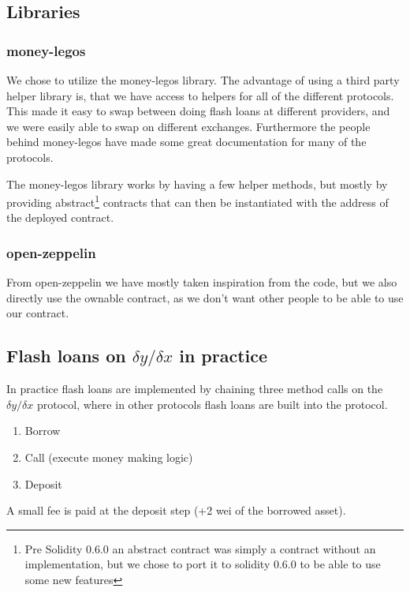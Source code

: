 \subsection{Libraries}
\subsubsection{money-legos}
We chose to utilize the money-legos library. The advantage of using a
third party helper library is, that we have access to helpers for all of the
different protocols. This made it easy to swap between doing flash loans at
different providers, and we were easily able to swap on different exchanges.
Furthermore the people behind money-legos have made some great
documentation for many of the protocols.

The money-legos library works by having a few helper methods, but mostly
by providing abstract\footnote{Pre Solidity 0.6.0 an abstract contract was
simply a contract without an implementation, but we chose to port it to solidity
0.6.0 to be able to use some new features} contracts that can then be
instantiated with the address of the deployed contract.

\subsubsection{open-zeppelin}

From open-zeppelin we have mostly taken inspiration from the code, but we
also directly use the ownable contract, as we don't want other people to be able
to use our contract.

\subsection{Flash loans on $\delta y/\delta x$ in practice}
In practice flash loans are implemented by chaining three method calls on the
$\delta y/\delta x$ protocol, where in other protocols flash loans are built
into the protocol.
\begin{enumerate}
    \item Borrow
    \item Call (execute money making logic)
    \item Deposit
\end{enumerate}
A small fee is paid at the deposit step (+2 wei of the borrowed asset).

